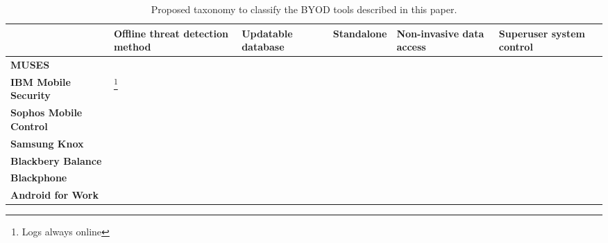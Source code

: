 \documentclass{article}
\newcommand{\cmark}{\ding{51}}%
\newcommand{\xmark}{\ding{55}}%
\newcommand{\nmark}{\scalebox{1.25}{\textbf{-}} }
\begin{document}
\begin{table}[ht]

  \centering
  \renewcommand{\arraystretch}{1.8}%
  \begin{tabular}{>{\centering\bfseries}m{0.8in} >{\centering}m{0.8in} >{\centering}m{0.8in} >{\centering}m{0.8in} >{\centering}m{0.8in} >{\centering\arraybackslash}m{0.8in}}
    \toprule
      & \textbf{Offline threat detection method} & \textbf{Updatable database} & \textbf{Standalone} & \textbf{Non-invasive data access} & \textbf{Superuser system control} \\
    \midrule
    MUSES & \cmark & \cmark & \cmark & \cmark & \cmark  \\
     \arrayrulecolor[gray]{0.8}\hline
    IBM Mobile Security & \xmark\footnote{Logs always online} & \xmark & \cmark & \xmark & \xmark  \\
     \arrayrulecolor[gray]{0.8}\hline
    Sophos Mobile Control & \cmark & \xmark & \cmark & \xmark & \xmark \\
     \arrayrulecolor[gray]{0.8}\hline
    Samsung Knox & \cmark & \nmark & \cmark & \nmark & \cmark\\
     \arrayrulecolor[gray]{0.8}\hline
     Blackbery Balance & \nmark & \nmark & \cmark & \nmark & \cmark\\
     \arrayrulecolor[gray]{0.8}\hline
    Blackphone & \nmark & \nmark & \cmark & \cmark & \nmark\\
     \arrayrulecolor[gray]{0.8}\hline
    Android for Work & \xmark & \xmark & \cmark & \xmark & \cmark\\
    \bottomrule
  \end{tabular}
  \caption{Proposed taxonomy to classify the BYOD tools described in this paper.}
\end{table}
\end{document}
